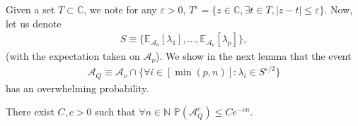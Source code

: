\documentclass[a4papaer, titlepage]{book}
\begin{document}
Given a set $T\subset \mathbb C$, we note for any $\varepsilon>0$, $T^\varepsilon = \{z \in \mathbb C, \exists t \in T, |z-t|\leq \varepsilon\}$. Now, let us denote
\begin{align*}
   S \equiv \{\mathbb E_{\mathcal A_\nu}[\lambda_1], \ldots, \mathbb E_{\mathcal A_\nu}[\lambda_p]\},
 \end{align*}
 (with the expectation taken on $\mathcal A_\nu$). We show in the next lemma that the event
\begin{align*}
  \mathcal A_Q \equiv \mathcal A_\nu \cap \{\forall i\in [\min(p,n)] : \lambda_i \in S^{\varepsilon/2}\}
\end{align*}
has an overwhelming probability.
\begin{lemma}\label{lem:A_Q_overwhelming}
  There exist $C,c >0$ such that $\forall n \in \mathbb N$ $\mathbb P(\mathcal A_Q^c) \leq Ce ^{-cn}$.
\end{lemma}
\end{document}
